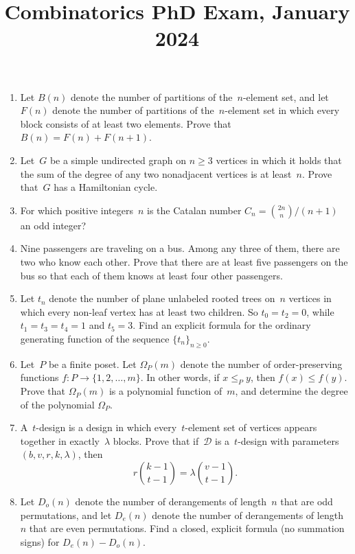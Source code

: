 \documentclass[11pt,letterpaper]{article}
\title{Combinatorics PhD Exam, January 2024}
\author{}
\date{}
\newenvironment{examproblems}[2]{%
  \def\ProblemHeadingTag{#2}%
  \AssignTaggingSocketPlug{block/list/label}{examproblem}%
  \begin{enumerate}%
  \setcounter{enumi}{#1}%
  \renewcommand{\labelenumi}{\textbf{\theenumi.}}%
  \setlength{\topsep}{0.35em}%
  \setlength{\partopsep}{0pt}%
  \setlength{\itemsep}{0.48em}%
  \setlength{\parsep}{0.18em}%
}{\end{enumerate}}
\begin{document}
\maketitle
\thispagestyle{empty}
\begin{examproblems}{0}{H2}
\def\ProblemHeadingText{Problem 1.}
\item
Let \(B(n)\) denote the number of partitions of the~\(n\)-element set, and let \(F(n)\) denote the number of partitions of the~\(n\)-element set in which every block consists of at least two elements. Prove that \(B(n)=F(n)+F(n+1)\).
\def\ProblemHeadingText{Problem 2.}
\item
Let~\(G\) be a simple undirected graph on \(n\ge 3\) vertices in which it holds that the sum of the degree of any two nonadjacent vertices is at least~\(n\). Prove that~\(G\) has a Hamiltonian cycle.
\def\ProblemHeadingText{Problem 3.}
\item
For which positive integers~\(n\) is the Catalan number \(C_n=\binom{2n}{n}/(n+1)\) an odd integer?
\def\ProblemHeadingText{Problem 4.}
\item
Nine passengers are traveling on a bus. Among any three of them, there are two who know each other. Prove that there are at least five passengers on the bus so that each of them knows at least four other passengers.
\def\ProblemHeadingText{Problem 5.}
\item
Let \(t_n\) denote the number of plane unlabeled rooted trees on~\(n\) vertices in which every non-leaf vertex has at least two children. So \(t_0=t_2=0\), while \(t_1=t_3=t_4=1\) and \(t_5=3\). Find an explicit formula for the ordinary generating function of the sequence \(\{t_n\}_{n\ge 0}\).
\def\ProblemHeadingText{Problem 6.}
\item
Let~\(P\) be a finite poset. Let \(\Omega_P(m)\) denote the number of order-preserving functions \(f:P\to\{1,2,\ldots,m\}\). In other words, if \(x\le_P y\), then \(f(x)\le f(y)\). Prove that \(\Omega_P(m)\) is a polynomial function of~\(m\), and determine the degree of the polynomial \(\Omega_P\).
\def\ProblemHeadingText{Problem 7.}
\item
A~\(t\)-design is a design in which every~\(t\)-element set of vertices appears together in exactly~\(\lambda\) blocks. Prove that if~\(\mathcal{D}\) is a~\(t\)-design with parameters \((b,v,r,k,\lambda)\), then
\[
r\binom{k-1}{t-1}=\lambda\binom{v-1}{t-1}.
\]
\def\ProblemHeadingText{Problem 8.}
\item
Let \(D_o(n)\) denote the number of derangements of length~\(n\) that are odd permutations, and let \(D_e(n)\) denote the number of derangements of length~\(n\) that are even permutations. Find a closed, explicit formula (no summation signs) for \(D_e(n)-D_o(n)\).
\end{examproblems}
\end{document}

